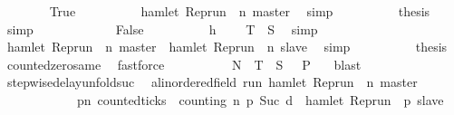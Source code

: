 \begin{isabellebody}
\ \ \ \ \ \ \isamarkupfalse%
\ True\isanewline
\ \ \ \ \ \ \ \ \isamarkupfalse%
\ {\isacartoucheopen}{\isasymnot}hamlet\ {\isacharparenleft}Rep{\isacharunderscore}run\ {\isasymrho}\ n\ master{\isacharparenright}{\isacartoucheclose}\ \isamarkupfalse%
\ simp\isanewline
\ \ \ \ \ \ \ \ \isamarkupfalse%
\ {\isacharquery}thesis\ \isamarkupfalse%
\ simp\isanewline
\ \ \ \ \isamarkupfalse%
\isanewline
\ \ \ \ \ \ \isamarkupfalse%
\ False\isanewline
\ \ \ \ \ \ \ \ \isamarkupfalse%
\ h\ \isamarkupfalse%
\ {\isacartoucheopen}{\isasymrho}\ {\isasymin}\ {\isacharquery}T\ {\isasyminter}\ {\isacharquery}S{\isacartoucheclose}\ \isamarkupfalse%
\ simp\isanewline
\ \ \ \ \ \ \ \ \isamarkupfalse%
\ {\isacartoucheopen}hamlet\ {\isacharparenleft}Rep{\isacharunderscore}run\ {\isasymrho}\ n\ master{\isacharparenright}\ {\isasymand}\ hamlet\ {\isacharparenleft}Rep{\isacharunderscore}run\ {\isasymrho}\ n\ slave{\isacharparenright}{\isacartoucheclose}\ \isamarkupfalse%
\ simp\isanewline
\ \ \ \ \ \ \ \ \isamarkupfalse%
\ {\isacharquery}thesis\ \isamarkupfalse%
\ counted{\isacharunderscore}zero{\isacharunderscore}same\ \isamarkupfalse%
\ fastforce\isanewline
\ \ \ \ \isamarkupfalse%
\isanewline
\ \ \isacommand{{\isacharbraceright}}\isamarkupfalse%
\ \isamarkupfalse%
\ {\isacartoucheopen}{\isacharquery}N\ {\isasymunion}\ {\isacharquery}T\ {\isasyminter}\ {\isacharquery}S\ {\isasymsubseteq}\ {\isacharbraceleft}{\isasymrho}{\isachardot}\ {\isacharquery}P\ {\isasymrho}{\isacharbraceright}{\isacartoucheclose}\ \isamarkupfalse%
\ blast\isanewline
{}\isamarkupfalse%
%
\endisatagproof
{\isafoldproof}%
%
\isadelimproof
\isanewline
%
\endisadelimproof
\isanewline
{}\isamarkupfalse%
\ stepwise{\isacharunderscore}delay{\isacharunderscore}unfold{\isacharunderscore}suc{\isacharcolon}\isanewline
\ \ {\isacartoucheopen}{\isacharbraceleft}{\isasymrho}{\isacharcolon}{\isacharcolon}{\isacharparenleft}{\isacharprime}a{\isacharcolon}{\isacharcolon}linordered{\isacharunderscore}field{\isacharparenright}\ run{\isachardot}\ hamlet\ {\isacharparenleft}Rep{\isacharunderscore}run\ {\isasymrho}\ n\ master{\isacharparenright}\ \isanewline
\ \ \ \ \ \ \ \ \ \ \ {\isasymlongrightarrow}\ {\isacharparenleft}{\isasymforall}p{\isasymge}n{\isachardot}\ counted{\isacharunderscore}ticks\ {\isasymrho}\ counting\ n\ p\ {\isacharparenleft}Suc\ d{\isacharparenright}\ {\isasymlongrightarrow}\ hamlet\ {\isacharparenleft}Rep{\isacharunderscore}run\ {\isasymrho}\ p\ slave{\isacharparenright}{\isacharparenright}{\isacharbraceright}\isanewline

\end{isabellebody}
